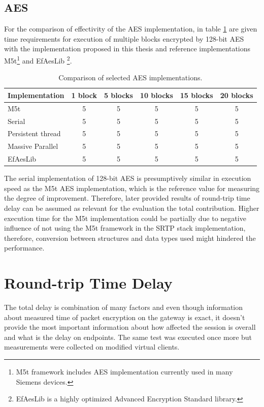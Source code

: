 \subsection*{AES}
For the comparison of effectivity of the AES implementation, in table 
\ref{aes-comparison} are given time requirements for execution of multiple
blocks encrypted by 128-bit AES with the implementation proposed in this thesis
and reference implementations M5t\footnote{ M5t framework includes AES 
implementation currently used in many Siemens devices\cite{m5t}.} and EfAesLib 
\footnote{ EfAesLib is a highly optimized Advanced Encryption Standard 
library\cite{aes-lib}.}.
\begin{table}[H]
\begin{center}
\begin{tabular}{|l|ccccc|}\hline%
Implementation &  1 block & 5 blocks & 10 blocks & 15 blocks & 20 blocks\\\hline
M5t                & 5       & 5       & 5        & 5        & 5 \\ 
Serial             & 5       & 5       & 5        & 5        & 5 \\
Persistent thread  & 5       & 5       & 5        & 5        & 5 \\
Massive Parallel   & 5       & 5       & 5        & 5        & 5 \\
EfAesLib           & 5       & 5       & 5        & 5        & 5 \\\hline
\end{tabular}
\end{center}
\caption{Comparison of selected AES implementations.}
\label{aes-comparison}
\end{table}

The serial implementation of 128-bit AES is presumptively similar in execution 
speed as the M5t AES implementation, which is the reference value for measuring
the degree of improvement. Therefore, later provided results of round-trip time
delay can be assumed as relevant for the evaluation the total contribution. 
Higher execution time for the M5t implementation could be partially due to
negative influence of not using the M5t framework in the SRTP stack 
implementation, therefore, conversion between structures and data types used
might hindered the performance. 
 

\section{Round-trip Time Delay}
The total delay is combination of many factors and even though information
about measured time of packet encryption on the gateway is exact, it doesn't
provide the most important information about how affected the session is overall
and what is the delay on endpoints. The same test was executed once more but
measurements were collected on modified virtual clients.

